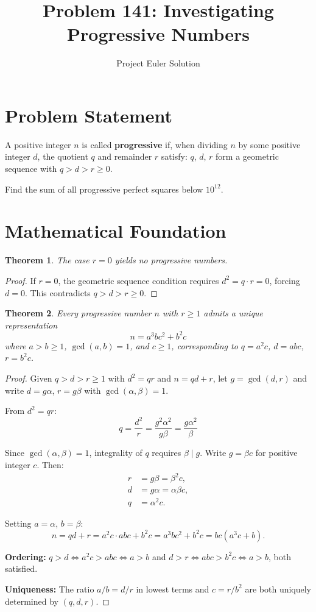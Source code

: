 \documentclass[12pt]{article}
\title{Problem 141: Investigating Progressive Numbers}
\author{Project Euler Solution}
\date{}
\newtheorem{theorem}{Theorem}
\begin{document}
\maketitle

\section{Problem Statement}
A positive integer $n$ is called \textbf{progressive} if, when dividing $n$ by some positive integer $d$, the quotient $q$ and remainder $r$ satisfy: $q$, $d$, $r$ form a geometric sequence with $q > d > r \geq 0$.

Find the sum of all progressive perfect squares below $10^{12}$.

\section{Mathematical Foundation}

\begin{theorem}
The case $r = 0$ yields no progressive numbers.
\end{theorem}

\begin{proof}
If $r = 0$, the geometric sequence condition requires $d^2 = q \cdot r = 0$, forcing $d = 0$. This contradicts $q > d > r \geq 0$.
\end{proof}

\begin{theorem}
Every progressive number $n$ with $r \geq 1$ admits a unique representation
\[
n = a^3 b c^2 + b^2 c
\]
where $a > b \geq 1$, $\gcd(a, b) = 1$, and $c \geq 1$, corresponding to $q = a^2 c$, $d = abc$, $r = b^2 c$.
\end{theorem}

\begin{proof}
Given $q > d > r \geq 1$ with $d^2 = qr$ and $n = qd + r$, let $g = \gcd(d, r)$ and write $d = g\alpha$, $r = g\beta$ with $\gcd(\alpha, \beta) = 1$.

From $d^2 = qr$:
\[
q = \frac{d^2}{r} = \frac{g^2\alpha^2}{g\beta} = \frac{g\alpha^2}{\beta}
\]

Since $\gcd(\alpha, \beta) = 1$, integrality of $q$ requires $\beta \mid g$. Write $g = \beta c$ for positive integer $c$. Then:
\begin{align*}
r &= g\beta = \beta^2 c, \\
d &= g\alpha = \alpha\beta c, \\
q &= \alpha^2 c.
\end{align*}

Setting $a = \alpha$, $b = \beta$:
\[
n = qd + r = a^2 c \cdot abc + b^2 c = a^3 bc^2 + b^2 c = bc(a^3 c + b).
\]

\textbf{Ordering:} $q > d \iff a^2 c > abc \iff a > b$ and $d > r \iff abc > b^2 c \iff a > b$, both satisfied.

\textbf{Uniqueness:} The ratio $a/b = d/r$ in lowest terms and $c = r/b^2$ are both uniquely determined by $(q,d,r)$.
\end{proof}
\end{document}
